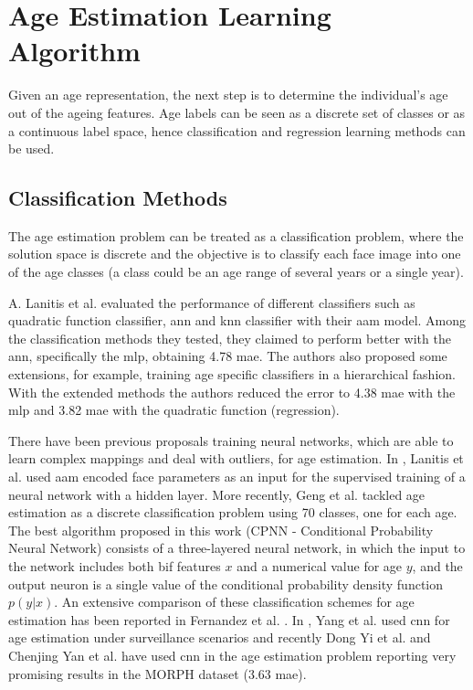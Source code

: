 \section{Age Estimation Learning Algorithm}
Given an age representation, the next step is to determine the individual's age out of the ageing features. Age labels can be seen as a discrete set of classes or as a continuous label space, hence classification and regression learning methods can be used.

\subsection{Classification Methods}

The age estimation problem can be treated as a classification problem, where the solution space is discrete and the objective is to classify each face image into one of the age classes (a class could be an age range of several years or a single year).

A. Lanitis et al. \cite{Lanitis:2004:CDC:2225304.2226166} evaluated the performance of different classifiers such as quadratic function classifier, \gls{ann} and \gls{knn} classifier with their \gls{aam} model. Among the classification methods they tested, they claimed to perform better with the \gls{ann}, specifically the \gls{mlp}, obtaining 4.78 \gls{mae}. The authors also proposed some extensions, for example, training age specific classifiers in a hierarchical fashion. With the extended methods the authors reduced the error to 4.38 \gls{mae} with the \gls{mlp} and 3.82 \gls{mae} with the quadratic function (regression).

There have been previous proposals training neural networks,
which are able to learn complex mappings and deal with
outliers, for age estimation. In \cite{Lanitis:2004:CDC:2225304.2226166}, Lanitis et al. used \gls{aam} encoded face parameters as an input for the supervised training
of a neural network with a hidden layer. More recently, Geng
et al. \cite{6475129} tackled age estimation as a discrete classification problem using 70 classes, one for each age. The best algorithm proposed in this work (CPNN - Conditional Probability Neural Network) consists of a three-layered neural network, in which the input to the network includes both \gls{bif} features $x$ and a numerical value for age $y$, and the output neuron is a single value of the conditional probability density function $p(y|x)$. An extensive comparison of these classification schemes for age estimation has been reported in Fernandez et al. \cite{2014icprw}. In \cite{5995481}, Yang et al. used \gls{cnn} for age estimation under surveillance scenarios and recently Dong Yi et al. \cite{yiage} and Chenjing Yan et al. \cite{yan2014} have used \gls{cnn} in the age estimation problem reporting very promising results in the MORPH dataset (3.63 \gls{mae}). 

